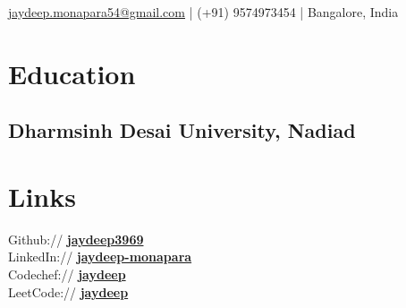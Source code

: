 \documentclass[]{jaydeep-resume-openfont}
\begin{document}
%
%
\lastupdated

%
%
{ \href{mailto:jaydeep.mmonapara54@gmail.com}{jaydeep.monapara54@gmail.com} | (+91) 9574973454 | Bangalore, India}

%
%

\begin{minipage}[t]{0.29\textwidth}


\section{Education}

\subsection{Dharmsinh Desai \newline University, Nadiad}
\sectionsep




\section{Links}

Github:// \href{https://github.com/jaydeep3969}{\bf jaydeep3969} \\
LinkedIn://  \href{https://in.linkedin.com/in/jaydeep-monapara-a70a48119}{\bf jaydeep-monapara} \\
Codechef:// \href {https://www.codechef.com/users/jaydeep_3969}{\bf jaydeep} \\
LeetCode:// \href {https://leetcode.com/jaydeep_3969/}{\bf jaydeep} \\


\end{minipage}
\end{document}
